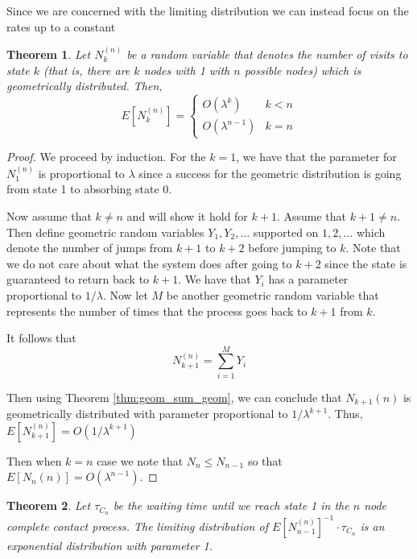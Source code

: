 \documentclass{article}
\theoremstyle{plain}
\newtheorem{theorem}{Theorem}[section]
\theoremstyle{definition}
\theoremstyle{remark}
\numberwithin{equation}{section}
\begin{document}
Since we are concerned with the limiting distribution we can instead focus on the rates up to a constant

\begin{theorem}
Let $N_k^{(n)}$ be a random variable that denotes the number of visits to state $k$ (that is, there are $k$ nodes with 1 with $n$ possible nodes) which is geometrically distributed. Then,
$$
E[N_k^{(n)}] = \begin{cases}
    O(\lambda^k) & k < n\\
    O(\lambda^{n - 1}) & k = n
\end{cases}
$$
\end{theorem}

\begin{proof}
We proceed by induction.
For the $k = 1$, we have that the parameter for $N_1^{(n)}$ is proportional to $\lambda$ since a success for the geometric distribution is going from state 1 to absorbing state 0.

Now assume that $k \not = n$ and will show it hold for $k + 1$.
Assume that $k + 1 \not = n$.
Then define geometric random variables $Y_1, Y_2, \ldots$ supported on $1,2,\ldots$ which denote the number of jumps from $k + 1$ to $k + 2$ before jumping to $k$.
Note that we do not care about what the system does after going to $k + 2$ since the state is guaranteed to return back to $k + 1$.
We have that $Y_i$ has a parameter proportional to $1/\lambda$.
Now let $M$ be another geometric random variable that represents the number of times that the process goes back to $k + 1$ from $k$.

It follows that
\begin{equation}
   N_{k + 1}^{(n)} = \sum_{i = 1}^M Y_i
\end{equation}

Then using Theorem \eqref{thm:geom_sum_geom}, we can conclude that $N_{k + 1}{(n)}$ is geometrically distributed with parameter proportional to $1/\lambda^{k + 1}$.
Thus, $E[N_{k + 1}^{(n)}] = O(1/\lambda^{k + 1})$

Then when $k = n$ case we note that $N_n \leq N_{n - 1}$ so that $E[N_{n}{(n)}] = O(\lambda^{n - 1})$.
\end{proof}

\begin{theorem}
Let $\tau_{C_n}$ be the waiting time until we reach state 1 in the $n$ node complete contact process.
The limiting distribution of $E[N_{n-1}^{(n)}]^{-1} \cdot \tau_{C_n}$ is an exponential distribution with parameter 1.
\end{theorem}
\end{document}
